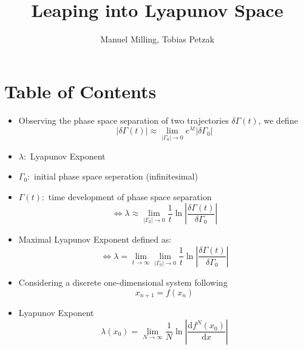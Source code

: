 \documentclass[ignorenonframetext]{beamer}
\title[]{Leaping into Lyapunov Space}
\subtitle{}
\author[Milling, Petzak]{\large{Manuel Milling, Tobias Petzak} \\
}
\institute[Universität Augsburg]{Institut für Physik der Universität Augsburg}
\date[21.03.2016]
\begin{document}
\frame[plain]{\titlepage}

\section*{Table of Contents}
\begin{frame}
\begin{itemize}
\item Observing the phase space separation of two trajectories $\delta\Gamma(t)$, we define
\begin{equation}
\left|\delta\Gamma(t)\right|\approx \lim\limits_{\left|\Gamma_0\right| \rightarrow0} e^{\lambda t}\left|\delta\Gamma_0\right|
\end{equation}
\item $\lambda:$ Lyapunov Exponent
\item $\Gamma_0:$ initial phase space seperation (infinitesimal)
\item $\Gamma(t):$ time development of phase space separation 
\begin{equation}
\Leftrightarrow \lambda\approx \lim\limits_{\left|\Gamma_0\right| \rightarrow0} \frac{1}{t}\ln\left|\frac{\delta\Gamma(t)}{\delta\Gamma_0}\right|
\end{equation}
\end{itemize}
\end{frame}

\begin{frame}
\begin{itemize}
\item Maximal Lyapunov Exponent defined as:
\begin{equation}
\Leftrightarrow \lambda = \lim\limits_{t \rightarrow \infty} \lim\limits_{\left|\Gamma_0\right| \rightarrow0}  \frac{1}{t}\ln\left|\frac{\delta\Gamma(t)}{\delta\Gamma_0}\right|
\end{equation}
\item Considering a discrete one-dimensional system following
\begin{equation}
x_{n+1}=f(x_n)
\end{equation}
\item Lyapunov Exponent
\begin{equation}
\lambda(x_0)=\lim\limits_{N\rightarrow\infty} \frac{1}{N} \ln\left|\frac{\mathrm{d}f^N(x_0)}{\mathrm{d}x}\right|
\end{equation}
\end{itemize}
\end{frame}
\end{document}
